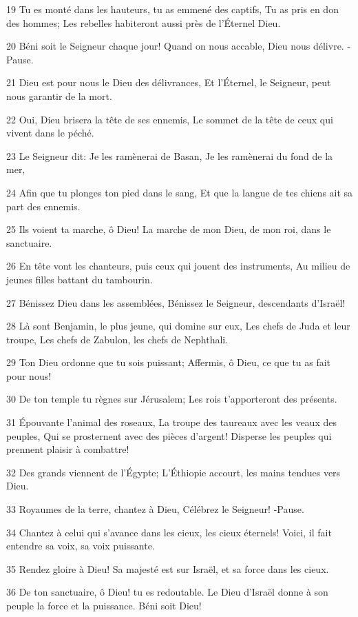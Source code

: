 \par 19 Tu es monté dans les hauteurs, tu as emmené des captifs, Tu as pris en don des hommes; Les rebelles habiteront aussi près de l'Éternel Dieu.
\par 20 Béni soit le Seigneur chaque jour! Quand on nous accable, Dieu nous délivre. -Pause.
\par 21 Dieu est pour nous le Dieu des délivrances, Et l'Éternel, le Seigneur, peut nous garantir de la mort.
\par 22 Oui, Dieu brisera la tête de ses ennemis, Le sommet de la tête de ceux qui vivent dans le péché.
\par 23 Le Seigneur dit: Je les ramènerai de Basan, Je les ramènerai du fond de la mer,
\par 24 Afin que tu plonges ton pied dans le sang, Et que la langue de tes chiens ait sa part des ennemis.
\par 25 Ils voient ta marche, ô Dieu! La marche de mon Dieu, de mon roi, dans le sanctuaire.
\par 26 En tête vont les chanteurs, puis ceux qui jouent des instruments, Au milieu de jeunes filles battant du tambourin.
\par 27 Bénissez Dieu dans les assemblées, Bénissez le Seigneur, descendants d'Israël!
\par 28 Là sont Benjamin, le plus jeune, qui domine sur eux, Les chefs de Juda et leur troupe, Les chefs de Zabulon, les chefs de Nephthali.
\par 29 Ton Dieu ordonne que tu sois puissant; Affermis, ô Dieu, ce que tu as fait pour nous!
\par 30 De ton temple tu règnes sur Jérusalem; Les rois t'apporteront des présents.
\par 31 Épouvante l'animal des roseaux, La troupe des taureaux avec les veaux des peuples, Qui se prosternent avec des pièces d'argent! Disperse les peuples qui prennent plaisir à combattre!
\par 32 Des grands viennent de l'Égypte; L'Éthiopie accourt, les mains tendues vers Dieu.
\par 33 Royaumes de la terre, chantez à Dieu, Célébrez le Seigneur! -Pause.
\par 34 Chantez à celui qui s'avance dans les cieux, les cieux éternels! Voici, il fait entendre sa voix, sa voix puissante.
\par 35 Rendez gloire à Dieu! Sa majesté est sur Israël, et sa force dans les cieux.
\par 36 De ton sanctuaire, ô Dieu! tu es redoutable. Le Dieu d'Israël donne à son peuple la force et la puissance. Béni soit Dieu!

